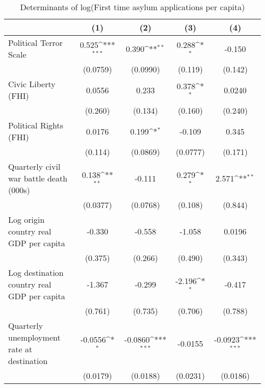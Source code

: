 \begin{table}[htbp]\centering
\def\sym#1{\ifmmode^{#1}\else\(^{#1}\)\fi}
\caption{Determinants of log(First time asylum applications per capita)}
\begin{tabular}{l*{4}{c}}
\hline\hline
                    &\multicolumn{1}{c}{(1)}         &\multicolumn{1}{c}{(2)}         &\multicolumn{1}{c}{(3)}         &\multicolumn{1}{c}{(4)}         \\
\hline
Political Terror Scale&       0.525\sym{***}&       0.390\sym{**} &       0.288\sym{*}  &      -0.150         \\
                    &    (0.0759)         &    (0.0990)         &     (0.119)         &     (0.142)         \\
[1em]
Civic Liberty (FHI) &      0.0556         &       0.233         &       0.378\sym{*}  &      0.0240         \\
                    &     (0.260)         &     (0.134)         &     (0.160)         &     (0.240)         \\
[1em]
Political Rights (FHI)&      0.0176         &       0.199\sym{*}  &      -0.109         &       0.345         \\
                    &     (0.114)         &    (0.0869)         &    (0.0777)         &     (0.171)         \\
[1em]
Quarterly civil war battle death (000s)&       0.138\sym{**} &      -0.111         &       0.279\sym{*}  &       2.571\sym{**} \\
                    &    (0.0377)         &    (0.0768)         &     (0.108)         &     (0.844)         \\
[1em]
Log origin country real GDP per capita&      -0.330         &      -0.558         &      -1.058         &      0.0196         \\
                    &     (0.375)         &     (0.266)         &     (0.490)         &     (0.343)         \\
[1em]
Log destination country real GDP per capita&      -1.367         &      -0.299         &      -2.196\sym{*}  &      -0.417         \\
                    &     (0.761)         &     (0.735)         &     (0.706)         &     (0.788)         \\
[1em]
Quarterly unemployment rate at destination&     -0.0556\sym{*}  &     -0.0860\sym{***}&     -0.0155         &     -0.0923\sym{***}\\
                    &    (0.0179)         &    (0.0188)         &    (0.0231)         &    (0.0186)         \\

\end{tabular}
\end{table}
